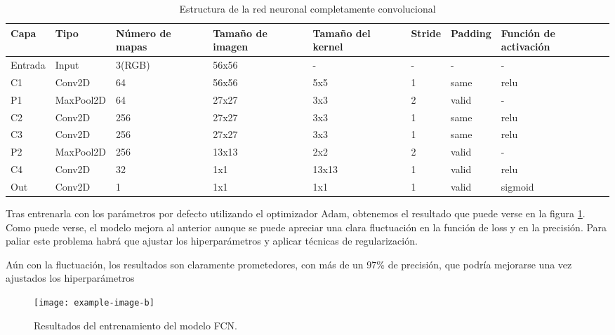 \begin{table}
  \centering
  \begin{tabular}{|l|l|p{1.4cm}|p{1.4cm}|p{1.5cm}|l|l|p{1.4cm}|}
  \hline
  Capa    & Tipo      & Número de mapas & Tamaño de imagen & Tamaño del kernel & Stride & Padding & Función de activación \\ \hline
Entrada & Input     & 3(RGB)          & 56x56            & -                 & -      & -       & -                     \\ \hline
C1      & Conv2D    & 64              & 56x56            & 5x5               & 1      & same    & relu                  \\ \hline
P1      & MaxPool2D & 64              & 27x27            & 3x3               & 2      & valid   & -                     \\ \hline
C2      & Conv2D    & 256             & 27x27            & 3x3               & 1      & same    & relu                  \\ \hline
C3      & Conv2D    & 256             & 27x27            & 3x3               & 1      & same    & relu                  \\ \hline
P2      & MaxPool2D & 256             & 13x13            & 2x2               & 2      & valid   & -                     \\ \hline
C4      & Conv2D    & 32              & 1x1              & 13x13             & 1      & valid   & relu                  \\ \hline
Out     & Conv2D    & 1               & 1x1              & 1x1               & 1      & valid   & sigmoid               \\ \hline
  \end{tabular}
  \caption{Estructura de la red neuronal completamente convolucional}
  \label{tabla:fcn}
  \end{table}

Tras entrenarla con los parámetros por defecto utilizando el optimizador Adam, obtenemos el resultado que puede verse en la figura \ref{fig:fcn}. Como puede verse, el modelo mejora al anterior aunque se puede apreciar una clara fluctuación en la función de loss y en la precisión. Para paliar este problema habrá que ajustar los hiperparámetros y aplicar técnicas de regularización.

Aún con la fluctuación, los resultados son claramente prometedores, con más de un 97\% de precisión, que podría mejorarse una vez ajustados los hiperparámetros

\begin{figure}[H]
	\centering
  \texttt{[image: example-image-b]}
	\caption{Resultados del entrenamiento del modelo FCN.}
  \label{fig:fcn}
\end{figure}


